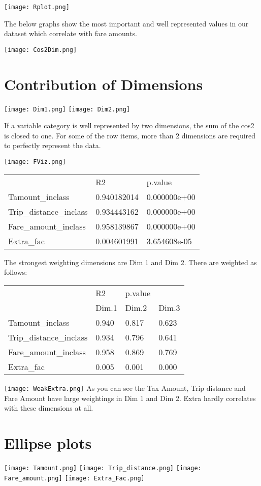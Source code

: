 \documentclass{article}
\begin{document}
\texttt{[image: Rplot.png]}

The below graphs show the most important and well represented values in our dataset which correlate with fare amounts.

\texttt{[image: Cos2Dim.png]}

\section{Contribution of Dimensions}
\texttt{[image: Dim1.png]}
\texttt{[image: Dim2.png]}

If a variable category is well represented by two dimensions, the sum of the cos2 is closed to one. For some of the row items, more than 2 dimensions are required to perfectly represent the data.

\texttt{[image: FViz.png]}

\label{my-label}
\begin{tabular}{lll}
& R2 & p.value \\
Tamount\_inclass       & 0.940182014 & 0.000000e+00 \\
Trip\_distance\_inclass & 0.934443162 & 0.000000e+00 \\
Fare\_amount\_inclass   & 0.958139867 & 0.000000e+00 \\
Extra\_fac             & 0.004601991 & 3.654608e-05
\end{tabular}

The strongest weighting dimensions are Dim 1 and Dim 2. There are weighted as follows:

\label{my-label}
\begin{tabular}{llll}
& R2 & p.value \\
                       & Dim.1 & Dim.2 & Dim.3 \\
Tamount\_inclass        & 0.940 & 0.817 & 0.623 \\
Trip\_distance\_inclass  & 0.934 & 0.796 & 0.641 \\
Fare\_amount\_inclass    & 0.958 & 0.869 & 0.769 \\
Extra\_fac              & 0.005 & 0.001 & 0.000
\end{tabular}

\texttt{[image: WeakExtra.png]}
As you can see the Tax Amount, Trip distance and Fare Amount have large weightings in Dim 1 and Dim 2. Extra hardly correlates with these dimensions at all.


\section{Ellipse plots}
\texttt{[image: Tamount.png]}
\texttt{[image: Trip\_distance.png]}
\texttt{[image: Fare\_amount.png]}
\texttt{[image: Extra\_Fac.png]}
\end{document}
